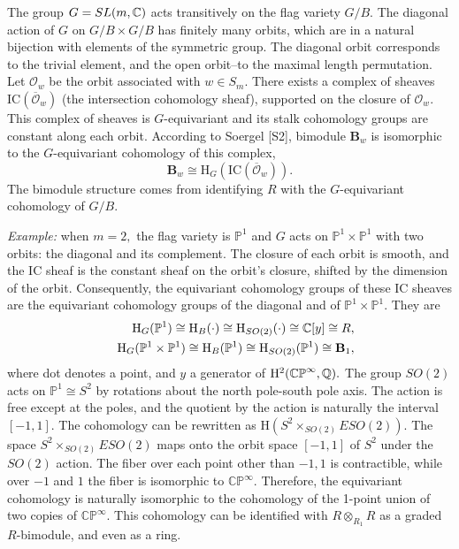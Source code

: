 \documentclass[12pt]{article}
\begin{document}
\hspace{0.1in} 

The group $G=SL(m,\mathbb C)$ acts transitively on the flag variety $G/B.$ 
The diagonal action of $G$ on $G/B\times G/B$ has finitely many 
orbits, which are in a natural bijection with elements of the symmetric 
group. The diagonal orbit corresponds to the trivial element, and 
the open orbit--to the maximal length permutation. Let $\mathcal{O}_w$ 
be the orbit associated with $w\in S_m.$ There exists a complex of 
sheaves $\mathrm{IC}(\overline{\mathcal{O}}_w)$ 
(the intersection cohomology sheaf), 
 supported on the closure of $\mathcal{O}_w.$ This complex of 
sheaves is $G$-equivariant and its stalk cohomology groups are constant 
along each orbit. According to Soergel [S2], bimodule $\mathbf{B}_w$  
is isomorphic to the $G$-equivariant cohomology of this complex,  
  $$ \mathbf{B}_w\cong \mathrm{H}_G(\mathrm{IC}
 (\overline{\mathcal{O}}_w)).$$ 
The bimodule structure comes from identifying $R$ with the $G$-equivariant 
cohomology of $G/B.$ 

\vspace{0.1in} 

\emph{Example:} when $m=2,$ the flag variety is $\mathbb{P}^1$ 
and $G$ acts on $\mathbb{P}^1\times \mathbb{P}^1$ with two 
orbits: the diagonal and its complement.  
The closure of each orbit is smooth, and the IC sheaf is the constant 
sheaf on the orbit's closure, shifted by the dimension of the orbit. 
Consequently, the equivariant cohomology groups of these IC sheaves 
are the equivariant cohomology groups of the diagonal and 
of $\mathbb{P}^1\times \mathbb{P}^1.$ They  are 
\begin{eqnarray*} 
& & \mathrm{H}_{G}(\mathbb{P}^1) \cong \mathrm{H}_B(\cdot) 
\cong \mathrm{H}_{SO(2)}(\cdot) \cong \mathbb C[y] \cong R, \\  & & 
 \mathrm{H}_{G}(\mathbb{P}^1\times \mathbb{P}^1) \cong 
\mathrm{H}_{B}(\mathbb{P}^1) \cong 
\mathrm{H}_{SO(2)}(\mathbb{P}^1)\cong \mathbf{B}_1, 
\end{eqnarray*} 
where dot denotes a point, and $y$ a generator of 
$\mathrm{H}^2(\mathbb{CP}^{\infty}, \mathbb Q).$ 
The group $SO(2)$ acts on $\mathbb{P}^1\cong S^2$ by rotations 
about the north pole-south pole axis. The action is free except at the 
poles, and the quotient by the action is naturally the interval $[-1,1].$ 
 The cohomology can be rewritten 
as $\mathrm{H}(S^2\times_{SO(2)}ESO(2)).$ 
The space $S^2\times_{SO(2)}ESO(2)$ maps onto 
the orbit space $[-1,1]$ of $S^2$ under the $SO(2)$ action. The 
fiber over each point other than $-1,1$ is contractible, while 
over $-1$ and $1$ the fiber is isomorphic to $\mathbb{CP}^{\infty}.$ 
Therefore, the equivariant cohomology is naturally isomorphic 
to the cohomology of the 1-point union of two copies of 
$ \mathbb{CP}^{\infty}.$ This cohomology can be identified 
with $R\otimes_{R_1} R$ as a graded $R$-bimodule, and even as 
a ring. 
\end{document}
